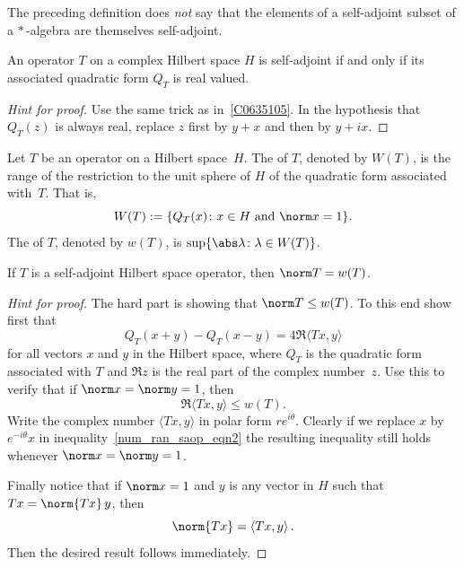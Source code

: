 \begin{cau} The preceding definition does \emph{not} say that the elements of a
self-adjoint subset of a $*\,$-algebra are themselves self-adjoint.
\end{cau}

 \begin{prop} An operator $T$ on a complex Hilbert space $H$ is self-adjoint if and only if
 its associated quadratic form $Q_T$ is real valued.
 \end{prop}

\begin{proof}[\emph{Hint for proof}] Use the same trick as in~\ref{C0635105}.  In the hypothesis that
$Q_T(z)$ is always real, replace $z$ first by $y + x$ and then by $y + ix$.   \ns
\end{proof}

\begin{defn} Let $T$ be an operator on a Hilbert space~$H$.  The
 of $T$, denoted by $W(T)$, is the range of the restriction to the unit sphere of $H$ of the
quadratic form associated with~$T$.  That is,
   \[ W(T) := \{Q_T(x) \colon x \in H \text{ and } \norm x = 1\}. \]
The
 of $T$, denoted by $w(T)$, is $\sup\{\abs \lambda\colon \lambda \in W(T)\}$.
\end{defn}

\begin{prop} If $T$ is a self-adjoint Hilbert space operator, then $\norm T = w(T)$.
\end{prop}

\begin{proof}[\emph{Hint for proof}] The hard part is showing that $\norm T \le w(T)$.  To this end show first that
   \begin{equation}
             Q_T(x + y) - Q_T(x - y) =   4 \Re\langle Tx,y \rangle
   \end{equation}
for all vectors $x$ and $y$ in the Hilbert space, where $Q_T$ is the quadratic form associated with $T$ and $\Re z$ is
the real part of the complex number~$z$.  Use this to verify that if $\norm x = \norm y = 1$, then
   \begin{equation}\label{num_ran_saop_eqn2}
           \Re\langle Tx,y \rangle \le w(T).
   \end{equation}
Write the complex number $\langle Tx,y \rangle$ in polar form $re^{i\theta}$.  Clearly if we replace
$x$ by $e^{-i\theta}x$ in inequality~\eqref{num_ran_saop_eqn2} the resulting inequality still holds whenever $\norm x = \norm y = 1$.

Finally notice that if $\norm x = 1$ and $y$ is any vector in $H$ such that $Tx = \norm{Tx}\,y$, then
   \begin{equation}
             \norm{Tx} = \langle Tx,y \rangle\,.
   \end{equation}
Then the desired result follows immediately.         \ns
\end{proof}

